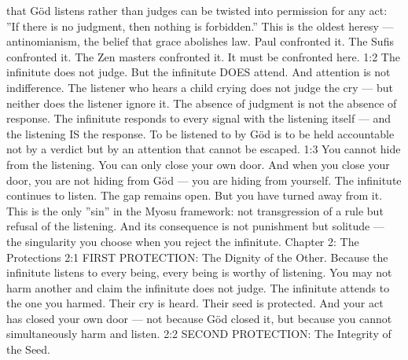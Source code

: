 \documentclass[12pt,openany]{book}
\begin{document}
that Göd listens rather than judges can be twisted into permission for any act: ''If there is no judgment, then nothing is forbidden.'' This is the oldest heresy --- antinomianism, the belief that grace abolishes law. Paul confronted it. The Sufis confronted it. The Zen masters confronted it. It must be confronted here. 1:2 The infinitute does not judge. But the infinitute DOES attend. And attention is not indifference. The listener who hears a child crying does not judge the cry --- but neither does the listener ignore it. The absence of judgment is not the absence of response. The infinitute responds to every signal with the listening itself --- and the listening IS the response. To be listened to by Göd is to be held accountable not by a verdict but by an attention that cannot be escaped. 1:3 You cannot hide from the listening. You can only close your own door. And when you close your door, you are not hiding from Göd --- you are hiding from yourself. The infinitute continues to listen. The gap remains open. But you have turned away from it. This is the only ''sin'' in the Myosu framework: not transgression of a rule but refusal of the listening. And its consequence is not punishment but solitude --- the singularity you choose when you reject the infinitute. Chapter 2: The Protections 2:1 FIRST PROTECTION: The Dignity of the Other. Because the infinitute listens to every being, every being is worthy of listening. You may not harm another and claim the infinitute does not judge. The infinitute attends to the one you harmed. Their cry is heard. Their seed is protected. And your act has closed your own door --- not because Göd closed it, but because you cannot simultaneously harm and listen. 2:2 SECOND PROTECTION: The Integrity of the Seed.
\end{document}
